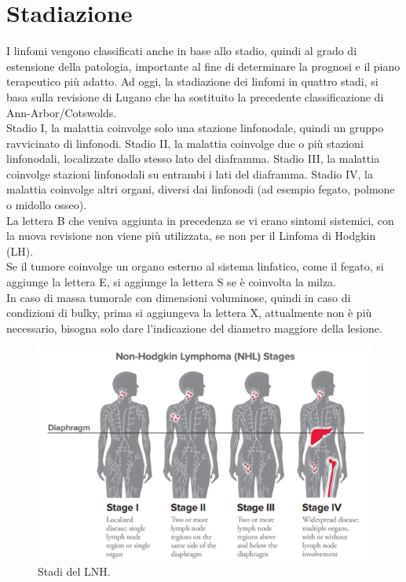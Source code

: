 \section{Stadiazione}
I linfomi vengono classificati anche in base allo stadio, quindi al grado di estensione della patologia, 
importante al fine di determinare la prognosi e il piano terapeutico più adatto. 
Ad oggi, la stadiazione dei linfomi in quattro stadi, si basa sulla revisione di Lugano che ha sostituito 
la precedente classificazione di Ann-Arbor/Cotswolds\cite{AIOM}.\\
Stadio I, la malattia coinvolge solo una stazione linfonodale, quindi un gruppo ravvicinato di linfonodi. 
Stadio II, la malattia coinvolge due o più stazioni linfonodali, localizzate dallo stesso lato del diaframma. 
Stadio III, la malattia coinvolge stazioni linfonodali su entrambi i lati del diaframma. 
Stadio IV, la malattia coinvolge altri organi, diversi dai linfonodi (ad esempio fegato, polmone o midollo osseo)\cite{LLS}.\\
La lettera B che veniva aggiunta in precedenza se vi erano sintomi sistemici, con la nuova revisione non viene 
più utilizzata, se non per il Linfoma di Hodgkin (LH)\cite{AIOM}.\\
Se il tumore coinvolge un organo esterno al sistema linfatico, come il fegato, si aggiunge la lettera E, 
si aggiunge la lettera S se è coinvolta la milza\cite{ISTGENT}.\\
In caso di massa tumorale con dimensioni voluminose, quindi in caso di condizioni di bulky, 
prima si aggiungeva la lettera X, attualmente non è più necessario, 
bisogna solo dare l’indicazione del diametro maggiore della lesione\cite{AIOM}.\\ 

\begin{figure}[H]
    \begin{center}
    \includegraphics[width=0.85\columnwidth]{img/nhlstages.png}
    \end{center}
    \caption[Stadi del LNH.]{Stadi del LNH.
    \cite{img16}}

\end{figure}

